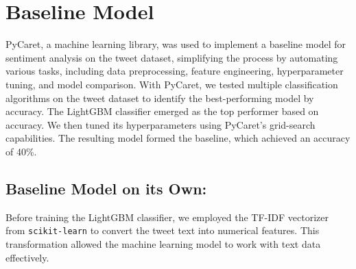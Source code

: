\section{Baseline Model}

PyCaret, a machine learning library, was used to implement a baseline model for sentiment analysis on the tweet dataset, simplifying the process by automating various tasks, including data preprocessing, feature engineering, hyperparameter tuning, and model comparison. With PyCaret, we tested multiple classification algorithms on the tweet dataset to identify the best-performing model by accuracy. The LightGBM classifier emerged as the top performer based on accuracy. We then tuned its hyperparameters using PyCaret's grid-search capabilities. The resulting model formed the baseline, which achieved an accuracy of 40\%.
\vspace{-0.75em}
\subsection{Baseline Model on its Own:}
\vspace{-1em}


Before training the LightGBM classifier, we employed the TF-IDF vectorizer from \texttt{scikit-learn} to convert the tweet text into numerical features. This transformation allowed the machine learning model to work with text data effectively.

